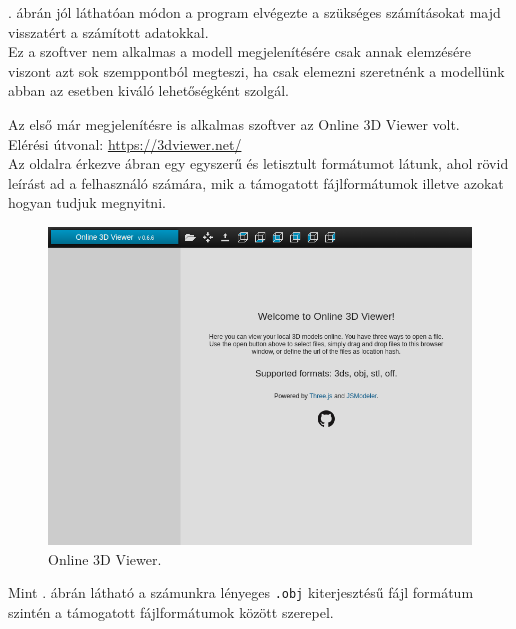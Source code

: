 . ábrán jól láthatóan módon a program elvégezte a szükséges számításokat majd visszatért a számított adatokkal.\\

Ez a szoftver nem alkalmas a modell megjelenítésére csak annak elemzésére viszont azt sok szemppontból megteszi, ha csak elemezni szeretnénk a modellünk abban az esetben kiváló lehetőségként szolgál.
\newpage
{}

Az első már megjelenítésre is alkalmas szoftver az Online 3D Viewer volt.\cite{online2014viktor}\\
Elérési útvonal: \url{https://3dviewer.net/}\\

Az oldalra érkezve  ábran egy egyszerű és letisztult formátumot látunk, ahol rövid leírást ad a felhasználó számára, mik a támogatott fájlformátumok illetve azokat hogyan tudjuk megnyitni. 
\begin{figure}[h]
\centering
\includegraphics[width=\textwidth]{images/Model_Viewer.png}
\caption{Online 3D Viewer.}
\label{fig:model_viewer1}
\end{figure}

Mint . ábrán látható a számunkra lényeges \texttt{.obj} kiterjesztésű fájl formátum szintén a támogatott fájlformátumok között szerepel.\\

